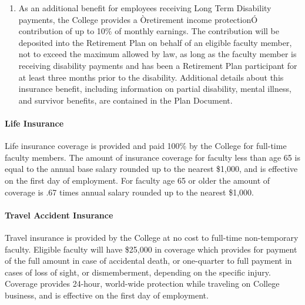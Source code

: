 \documentclass[letterpaper, 11pt]{article}
\begin{document}
\begin{enumerate}[label=\alph*)]
					\item{As an additional benefit for employees receiving Long Term Disability payments, the College provides a Òretirement income protectionÓ contribution of up to 10\% of monthly earnings.  The contribution will be deposited into the Retirement Plan on behalf of an eligible faculty member, not to exceed the maximum allowed by law, as long as the faculty member is receiving disability payments and has been a Retirement Plan participant for at least three months prior to the disability.}
					Additional details about this insurance benefit, including information on partial disability, mental illness, and survivor benefits, are contained in the Plan Document.
				\end{enumerate}
			\paragraph{Life Insurance}
				Life insurance coverage is provided and paid 100\% by the College for
				full-time faculty members.  The amount of insurance coverage for faculty less
				than age 65 is equal to the annual base salary rounded up to the nearest
				\$1,000, and is effective on the first day of employment.  For faculty age 65
				or older the amount of coverage is .67 times annual salary rounded up to the
				nearest \$1,000.
			\paragraph{Travel Accident Insurance}
				Travel insurance is provided by the College at no cost to full-time
				non-temporary faculty.  Eligible faculty will have \$25,000 in coverage which provides for payment of the full amount in case of accidental death, or one-quarter to full payment in cases of loss of sight, or dismemberment, depending on the specific injury.  Coverage provides 24-hour, world-wide protection while traveling on College business, and is effective on the first day of employment.
\end{document}
